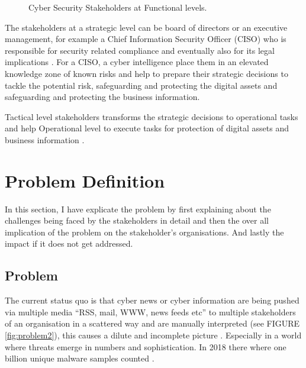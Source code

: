 \begin{figure}[htbp!]
\centering
    \caption{Cyber Security Stakeholders at Functional levels.}
    \label{fig:stakeholders}
\end{figure}
\FloatBarrier
The stakeholders
at a strategic level 
can be board of directors or an executive management, 
for example a Chief Information Security Officer (CISO) 
who is responsible for security related compliance 
and eventually also for its legal implications
\citep{farnham2013tools}. 
For a CISO, 
a cyber intelligence place them in an elevated knowledge zone 
of known risks 
and help to prepare their strategic decisions 
to tackle the potential risk,  
safeguarding and protecting the digital assets 
and safeguarding and protecting the business information. 

Tactical level stakeholders
transforms the strategic decisions to operational tasks 
and help Operational level to execute tasks 
for protection of digital assets and business information
\citep{farnham2013tools}.

\section{Problem Definition}

In this section, I have explicate the problem by first
explaining about the challenges being faced by the stakeholders in detail and then the over all implication of the problem on the stakeholder’s organisations. 
And lastly the impact if it does not get addressed.

\subsection{Problem}

The current status quo 
is that cyber news or cyber information 
are being pushed via multiple media 
\enquote{RSS, mail, WWW, news feeds etc} 
to multiple stakeholders of an organisation  
in a scattered way 
\citep{schales2011stream}
and are manually interpreted (see FIGURE \ref{fig:problem2}), 
this causes a dilute and incomplete picture 
\citep{liao2016acing}. 
Especially in a world where threats emerge 
in numbers and sophistication. 
In 2018 there where one billion unique malware samples counted
\citep{kucuk2020deceiving}.

